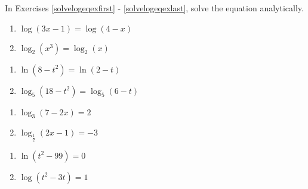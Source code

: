 \label{ExercisesforLogarithmicEquationsandInequalities}

In Exercises \ref{solvelogeqexfirst} - \ref{solvelogeqexlast}, solve the equation analytically.

\begin{multicols}{2}
\begin{enumerate}

\item $\log(3x-1) = \log(4-x)$   \label{solvelogeqexfirst}

\item $\log_{2}\left(x^{3}\right) = \log_{2}(x)$

\setcounter{HW}{\value{enumi}}
\end{enumerate}
\end{multicols}

\begin{multicols}{2}
\begin{enumerate}
\setcounter{enumi}{\value{HW}}

\item $\ln\left(8-t^2\right)=\ln(2-t)$ 

\item $\log_{5}\left(18-t^2\right) = \log_{5}(6-t)$

\setcounter{HW}{\value{enumi}}
\end{enumerate}
\end{multicols}

\begin{multicols}{2}
\begin{enumerate}
\setcounter{enumi}{\value{HW}}

\item $\log_{3}(7-2x) = 2$ 
\item $\log_{\frac{1}{2}} (2x-1) = -3$

\setcounter{HW}{\value{enumi}}
\end{enumerate}
\end{multicols}

\begin{multicols}{2}
\begin{enumerate}
\setcounter{enumi}{\value{HW}}

\item $\ln\left(t^2-99\right) = 0$
\item $\log(t^2-3t) = 1$

\setcounter{HW}{\value{enumi}}
\end{enumerate}
\end{multicols}


